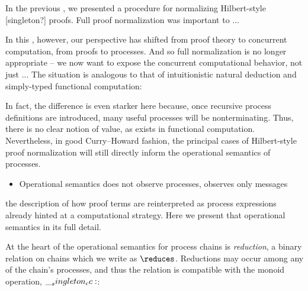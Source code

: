 In the previous , we presented a procedure for normalizing Hilbert-style [singleton?] proofs.
Full proof normalization was important to ...

In this , however, our perspective has shifted from proof theory to concurrent computation, from proofs to processes.
And so full normalization is no longer appropriate -- we now want to expose the concurrent computational behavior, not just ...
The situation is analogous to that of intuitionistic natural deduction and simply-typed functional computation:

In fact, the difference is even starker here because, once recursive process definitions are introduced, many useful processes will be nonterminating.
Thus, there is no clear notion of value, as exists in functional computation.
Nevertheless, in good Curry--Howard fashion, the principal cases of Hilbert-style proof normalization will still directly inform the operational semantics of processes.

\begin{itemize}
\item Operational semantics does not observe processes, observes only messages
\end{itemize}

 the description of how proof terms are reinterpreted as process expressions already hinted at a computational strategy.
Here we present that operational semantics in its full detail.


At the heart of the operational semantics for process chains is \emph{reduction}, a binary relation on chains which we write as $\reduces$.
Reductions may occur among any of the chain's processes, and thus the relation is compatible with the monoid operation, $\__singleton_cc:$:

